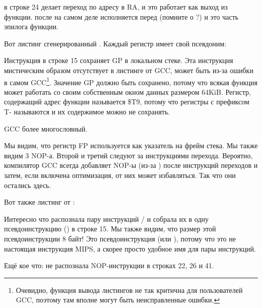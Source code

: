  в строке 24 делает переход по адресу в \ac{RA}, и это работает как выход из функции.
 после  на самом деле исполняется перед  (помните о ?) 
и это часть эпилога функции.

Вот листинг сгенерированный \IDA. Каждый регистр имеет свой псевдоним:



Инструкция в строке 15 сохраняет GP в локальном стеке. Эта инструкция мистическим образом отсутствует
в листинге от GCC, может быть из-за ошибки в самом GCC\footnote{Очевидно, функция вывода листингов не так критична
для пользователей GCC, поэтому там вполне могут быть неисправленные ошибки.}.
Значение GP должно быть сохранено, потому что всякая функция может работать со своим собственным окном данных
размером 64KiB.
Регистр, содержащий адрес функции \puts называется \$T9, потому что регистры с префиксом T- называются
 и их содержимое можно не сохранять.


\NonOptimizing GCC более многословный.



Мы видим, что регистр FP используется как указатель на фрейм стека.
Мы также видим 3 \ac{NOP}-а.
Второй и третий следуют за инструкциями перехода.
Вероятно, компилятор GCC всегда добавляет \ac{NOP}-ы (из-за )
после инструкций переходов и затем, если включена оптимизация, от них может избавляться.
Так что они остались здесь.

Вот также листинг от \IDA:



Интересно что \IDA распознала пару инструкций / и собрала их в одну псевдоинструкцию 
 () в строке 15.
Мы также видим, что размер этой псевдоинструкции 8 байт!
Это псевдоинструкция (или ), потому что это не настоящая инструкция MIPS, а скорее
просто удобное имя для пары инструкций.

Ещё кое что: \IDA не распознала \ac{NOP}-инструкции в строках 22, 26 и 41.

